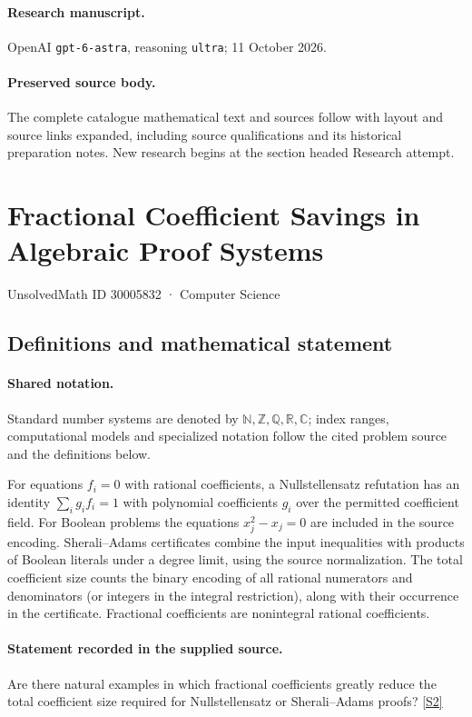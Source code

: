 \documentclass[11pt]{article}
\begin{document}
\paragraph{Research manuscript.} OpenAI \texttt{gpt-6-astra}, reasoning \texttt{ultra}; 11 October 2026.
\paragraph{Preserved source body.} The complete catalogue mathematical text and sources follow with layout and source links expanded, including source qualifications and its historical preparation notes. New research begins at the section headed Research attempt.

\section{Fractional Coefficient Savings in Algebraic Proof Systems}\label{30005832}
{\small UnsolvedMath ID 30005832 · Computer Science}
\subsection{Definitions and mathematical statement}

\paragraph{Shared notation.}Standard number systems are denoted by $\mathbb N,\mathbb Z,\mathbb Q,\mathbb R,\mathbb C$; index ranges, computational models and specialized notation follow the cited problem source and the definitions below.


For equations $f_i=0$ with rational coefficients, a Nullstellensatz refutation has an identity $\sum_i g_i f_i=1$ with polynomial coefficients $g_i$ over the permitted coefficient field. For Boolean problems the equations $x_j^2-x_j=0$ are included in the source encoding. Sherali--Adams certificates combine the input inequalities with products of Boolean literals under a degree limit, using the source normalization. The total coefficient size counts the binary encoding of all rational numerators and denominators (or integers in the integral restriction), along with their occurrence in the certificate. Fractional coefficients are nonintegral rational coefficients.
\paragraph{Statement recorded in the supplied source.}
Are there natural examples in which fractional coefficients greatly reduce the total coefficient size required for Nullstellensatz or Sherali–Adams proofs? \href{https://doi.org/10.4171/owr/2024/15}{[S2]}
\end{document}
